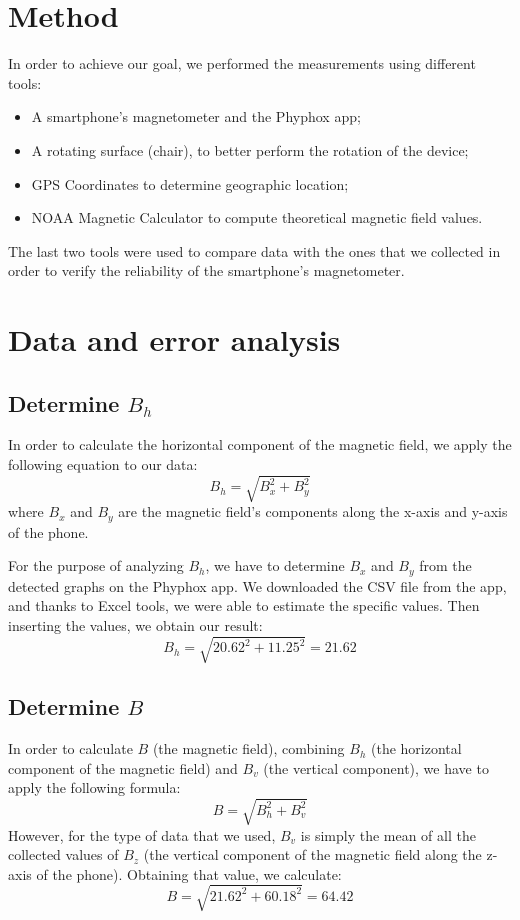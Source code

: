 \documentclass[notitlepage]{report}
\newcounter{theo}[section]\setcounter{theo}{0}
\numberwithin{equation}{section}
\theoremstyle{plain}
\theoremstyle{definition}
\theoremstyle{remark}
\begin{document}
\section{Method}
In order to achieve our goal, we performed the measurements using different tools:
\begin{itemize}
    \item A smartphone’s magnetometer and the Phyphox app;
    \item A rotating surface (chair), to better perform the rotation of the device;
    \item GPS Coordinates to determine geographic location;
    \item NOAA Magnetic Calculator to compute theoretical magnetic field values.
\end{itemize}

The last two tools were used to compare data with the ones that we collected in order to verify the reliability of the smartphone’s magnetometer. 

\section{Data and error analysis}
\subsection{Determine $B_h$}
In order to calculate the horizontal component of the magnetic field, we apply the following equation to our data: 
\[ B_h = \sqrt{B_x^2 + B_y^2} \]
where $B_x$ and $B_y$ are the magnetic field’s components along the x-axis and y-axis of the phone.

For the purpose of analyzing $B_h$, we have to determine $B_x$ and $B_y$ from the detected graphs on the Phyphox app. We downloaded the CSV file from the app, and thanks to Excel tools, we were able to estimate the specific values. Then inserting the values, we obtain our result: 
\[ B_h = \sqrt{20.62^2 + 11.25^2} = 21.62 \]

\subsection{Determine $B$}
In order to calculate $B$ (the magnetic field), combining $B_h$ (the horizontal component of the magnetic field) and $B_v$ (the vertical component), we have to apply the following formula:
\[ B = \sqrt{B_h^2 + B_v^2} \]
However, for the type of data that we used, $B_v$ is simply the mean of all the collected values of $B_z$ (the vertical component of the magnetic field along the z-axis of the phone). Obtaining that value, we calculate:
\[ B = \sqrt{21.62^2 + 60.18^2} = 64.42 \]
\end{document}

